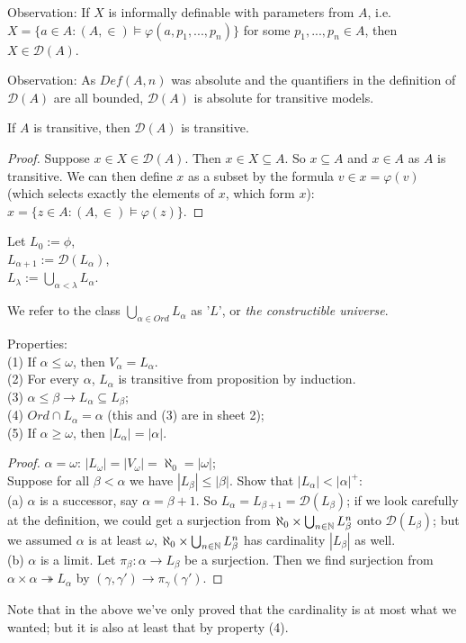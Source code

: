 \documentclass[a4paper]{article}
\begin{document}
Observation: If $X$ is informally definable with parameters from $A$, i.e. $X = \{ a \in A: (A,\in) \vDash \varphi(a,p_1,...,p_n) \}$ for some $p_1,...,p_n \in A$, then $X \in \mathcal{D}(A)$.

Observation: As $Def(A,n)$ was absolute and the quantifiers in the definition of $\mathcal{D}(A)$ are all bounded, $\mathcal{D}(A)$ is absolute for transitive models.

\begin{prop}
If $A$ is transitive, then $\mathcal{D}(A)$ is transitive.
\begin{proof}
Suppose $x \in X \in \mathcal{D}(A)$. Then $x \in X \subseteq A$. So $x \subseteq A$ and $x \in A$ as $A$ is transitive. We can then define $x$ as a subset by the formula $v \in x = \varphi(v)$ (which selects exactly the elements of $x$, which form $x$): $x = \{z \in A: (A,\in) \vDash \varphi(z)\}$.
\end{proof}
\end{prop}

Let $L_0:=\phi$,\\
$L_{\alpha+1}:= \mathcal{D}(L_\alpha)$,\\
$L_{\lambda} := \bigcup_{\alpha<\lambda} L_\alpha$.

We refer to the class $\bigcup_{\alpha \in Ord} L_\alpha$ as '$L$', or \emph{the constructible universe}.

Properties: \\
(1) If $\alpha \leq \omega$, then $V_\alpha = L_\alpha$.\\
(2) For every $\alpha$, $L_\alpha$ is transitive from proposition by induction.\\
(3) $\alpha \leq \beta \to L_\alpha \subseteq L_\beta$;\\
(4) $Ord \cap L_\alpha = \alpha$ (this and (3) are in sheet 2);\\
(5) If $\alpha \geq \omega$, then $|L_\alpha| = |\alpha|$.
\begin{proof}
$\alpha=\omega$: $|L_\omega| = |V_\omega| = \aleph_0 = |\omega|$;\\
Suppose for all $\beta < \alpha$ we have $|L_\beta| \leq |\beta|$. Show that $|L_\alpha| < |\alpha|^+$:\\
(a) $\alpha$ is a successor, say $\alpha = \beta+1$. So $L_\alpha = L_{\beta+1} = \mathcal{D}(L_\beta)$; if we look carefully at the definition, we could get a surjection from $\aleph_0 \times \bigcup_{n \in \mathbb{N}} L_\beta^n$ onto $\mathcal{D}(L_\beta)$; but we assumed $\alpha$ is at least $\omega$, $\aleph_0 \times \bigcup_{n \in \mathbb{N}} L_\beta^n$ has cardinality $|L_\beta|$ as well.\\
(b) $\alpha$ is a limit. Let $\pi_\beta: \alpha \to L_\beta$ be a surjection. Then we find surjection from $\alpha \times \alpha \twoheadrightarrow L_\alpha$ by $(\gamma,\gamma') \to \pi_\gamma(\gamma')$.
\end{proof}
Note that in the above we've only proved that the cardinality is at most what we wanted; but it is also at least that by property (4).\\
\end{document}
